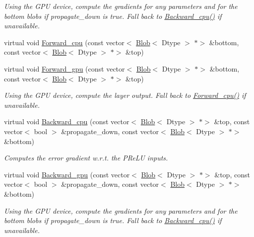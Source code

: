 \begin{DoxyCompactItemize}
\begin{DoxyCompactList}\small\item\em Using the G\+PU device, compute the gradients for any parameters and for the bottom blobs if propagate\+\_\+down is true. Fall back to \mbox{\hyperlink{classcaffe_1_1_p_re_l_u_layer_ab2e8ecd631bc37fdabecefbc91ee21a0}{Backward\+\_\+cpu()}} if unavailable. \end{DoxyCompactList}\item 
virtual void \mbox{\hyperlink{classcaffe_1_1_p_re_l_u_layer_a96c0dbe910e3700838d7e057bbac5206}{Forward\+\_\+cpu}} (const vector$<$ \mbox{\hyperlink{classcaffe_1_1_blob}{Blob}}$<$ Dtype $>$ $\ast$$>$ \&bottom, const vector$<$ \mbox{\hyperlink{classcaffe_1_1_blob}{Blob}}$<$ Dtype $>$ $\ast$$>$ \&top)
\item 
\mbox{\label{classcaffe_1_1_p_re_l_u_layer_a5f87617dbd3f561a6f7548dd09d5f486}} 
virtual void \mbox{\hyperlink{classcaffe_1_1_p_re_l_u_layer_a5f87617dbd3f561a6f7548dd09d5f486}{Forward\+\_\+gpu}} (const vector$<$ \mbox{\hyperlink{classcaffe_1_1_blob}{Blob}}$<$ Dtype $>$ $\ast$$>$ \&bottom, const vector$<$ \mbox{\hyperlink{classcaffe_1_1_blob}{Blob}}$<$ Dtype $>$ $\ast$$>$ \&top)
\begin{DoxyCompactList}\small\item\em Using the G\+PU device, compute the layer output. Fall back to \mbox{\hyperlink{classcaffe_1_1_p_re_l_u_layer_ab29811e077cc15d6751366d3f918acd6}{Forward\+\_\+cpu()}} if unavailable. \end{DoxyCompactList}\item 
virtual void \mbox{\hyperlink{classcaffe_1_1_p_re_l_u_layer_ae8bce88266c9ec626eacfaf190f34e33}{Backward\+\_\+cpu}} (const vector$<$ \mbox{\hyperlink{classcaffe_1_1_blob}{Blob}}$<$ Dtype $>$ $\ast$$>$ \&top, const vector$<$ bool $>$ \&propagate\+\_\+down, const vector$<$ \mbox{\hyperlink{classcaffe_1_1_blob}{Blob}}$<$ Dtype $>$ $\ast$$>$ \&bottom)
\begin{DoxyCompactList}\small\item\em Computes the error gradient w.\+r.\+t. the P\+Re\+LU inputs. \end{DoxyCompactList}\item 
\mbox{\label{classcaffe_1_1_p_re_l_u_layer_a16aa9d25c3ba6af789a7e1fee8ae1dfa}} 
virtual void \mbox{\hyperlink{classcaffe_1_1_p_re_l_u_layer_a16aa9d25c3ba6af789a7e1fee8ae1dfa}{Backward\+\_\+gpu}} (const vector$<$ \mbox{\hyperlink{classcaffe_1_1_blob}{Blob}}$<$ Dtype $>$ $\ast$$>$ \&top, const vector$<$ bool $>$ \&propagate\+\_\+down, const vector$<$ \mbox{\hyperlink{classcaffe_1_1_blob}{Blob}}$<$ Dtype $>$ $\ast$$>$ \&bottom)
\begin{DoxyCompactList}\small\item\em Using the G\+PU device, compute the gradients for any parameters and for the bottom blobs if propagate\+\_\+down is true. Fall back to \mbox{\hyperlink{classcaffe_1_1_p_re_l_u_layer_ab2e8ecd631bc37fdabecefbc91ee21a0}{Backward\+\_\+cpu()}} if unavailable. \end{DoxyCompactList}\end{DoxyCompactItemize}
